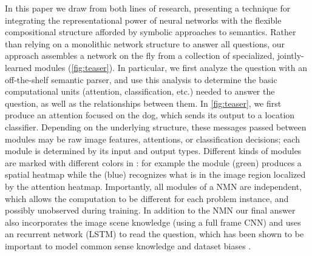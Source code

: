 In this paper we draw from both lines of research, presenting a technique for
integrating the representational power of neural networks with the flexible
compositional structure afforded by symbolic approaches to semantics.  Rather
than relying on a monolithic network structure to answer all questions, our
approach assembles a network on the fly from a collection of specialized,
jointly-learned modules (\autoref{fig:teaser}). In particular, we first analyze
the question with an off-the-shelf semantic parser, and use this analysis to
determine the basic computational units (attention, classification, etc.) needed
to answer the question, as well as the relationships between them. In
\autoref{fig:teaser}, we first produce an attention focused on the dog, which sends its output to
a location classifier. Depending on the underlying structure, these messages
passed between modules may be raw image features, attentions, or classification
decisions; each module is determined by its input and output types.
Different kinds of modules are marked with different
colors in : for example the  module
(green) produces a spatial heatmap while the  (blue)
recognizes what is in the image region localized by the attention heatmap.
Importantly, all modules of a NMN are independent, which allows the computation
to be different for each problem instance, and possibly unobserved during
training. 
In addition to the NMN our final answer also incorporates the image scene
knowledge (using a full frame CNN) and uses an  recurrent network (LSTM) to read
the question, which has been shown to be important to model common sense
knowledge and dataset biases \cite{malinowski15iccv}.






